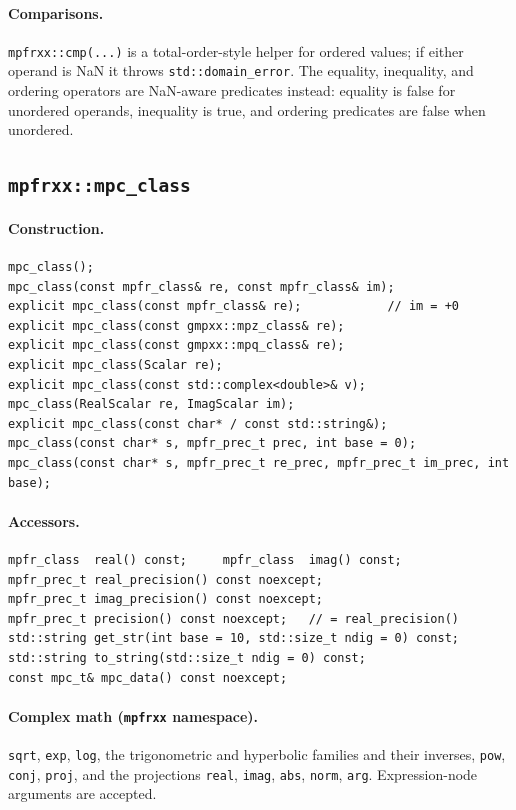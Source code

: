 \documentclass[11pt,a4paper]{article}
\newcommand{\code}[1]{\lstinline!#1!}
\begin{document}
\paragraph{Comparisons.}
\code{mpfrxx::cmp(...)} is a total-order-style helper for ordered values; if
either operand is NaN it throws \code{std::domain_error}. The equality,
inequality, and ordering operators are NaN-aware predicates instead: equality is
false for unordered operands, inequality is true, and ordering predicates are
false when unordered.

\subsection{\code{mpfrxx::mpc_class}}

\paragraph{Construction.}
\begin{lstlisting}
mpc_class();
mpc_class(const mpfr_class& re, const mpfr_class& im);
explicit mpc_class(const mpfr_class& re);            // im = +0
explicit mpc_class(const gmpxx::mpz_class& re);
explicit mpc_class(const gmpxx::mpq_class& re);
explicit mpc_class(Scalar re);
explicit mpc_class(const std::complex<double>& v);
mpc_class(RealScalar re, ImagScalar im);
explicit mpc_class(const char* / const std::string&);
mpc_class(const char* s, mpfr_prec_t prec, int base = 0);
mpc_class(const char* s, mpfr_prec_t re_prec, mpfr_prec_t im_prec, int base);
\end{lstlisting}

\paragraph{Accessors.}
\begin{lstlisting}
mpfr_class  real() const;     mpfr_class  imag() const;
mpfr_prec_t real_precision() const noexcept;
mpfr_prec_t imag_precision() const noexcept;
mpfr_prec_t precision() const noexcept;   // = real_precision()
std::string get_str(int base = 10, std::size_t ndig = 0) const;
std::string to_string(std::size_t ndig = 0) const;
const mpc_t& mpc_data() const noexcept;
\end{lstlisting}

\paragraph{Complex math (\code{mpfrxx} namespace).}
\code{sqrt}, \code{exp}, \code{log}, the trigonometric and hyperbolic families
and their inverses, \code{pow}, \code{conj}, \code{proj}, and the projections
\code{real}, \code{imag}, \code{abs}, \code{norm}, \code{arg}. Expression-node
arguments are accepted.
\end{document}
